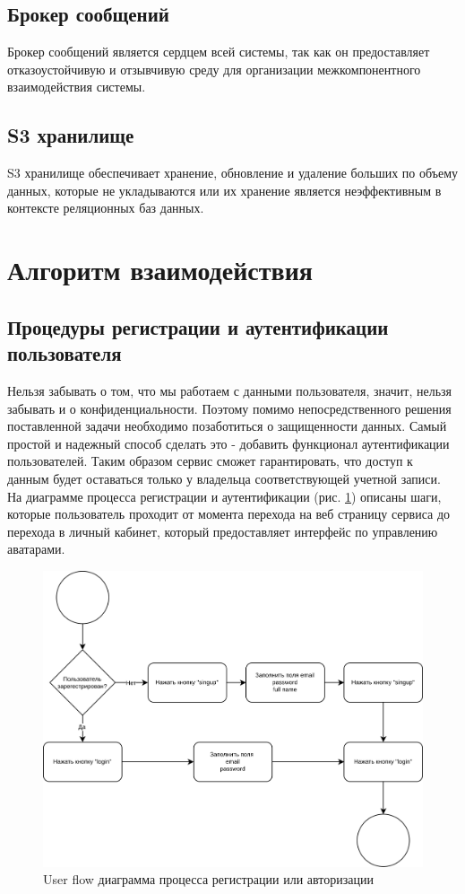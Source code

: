 \subsection{Брокер сообщений}
Брокер сообщений является сердцем всей системы, так как он предоставляет отказоустойчивую и отзывчивую среду для организации межкомпонентного взаимодействия системы.

\subsection{S3 хранилище}
S3 хранилище обеспечивает хранение, обновление и удаление больших по объему данных, которые не укладываются или их хранение является неэффективным в контексте реляционных баз данных.

\section{Алгоритм взаимодействия}

\subsection{Процедуры регистрации и аутентификации пользователя}
Нельзя забывать о том, что мы работаем с данными пользователя, значит, нельзя забывать и о конфиденциальности. Поэтому помимо непосредственного решения поставленной задачи необходимо позаботиться о защищенности данных. Самый простой и надежный способ сделать это - добавить функционал аутентификации пользователей. Таким образом сервис сможет гарантировать, что доступ к данным будет оставаться только у владельца соответствующей учетной записи. На диаграмме процесса регистрации и аутентификации (рис. \ref{fig:uf-log-or-reg}) описаны шаги, которые пользователь проходит от момента перехода на веб страницу сервиса до перехода в личный кабинет, который предоставляет интерфейс по управлению аватарами.

\begin{figure}[h!]
     \centering
     \includegraphics[width=1.0\linewidth]{images/UF-login-or-reg.png}
     \caption{User flow диаграмма процесса регистрации или авторизации}
     \label{fig:uf-log-or-reg}
\end{figure}

